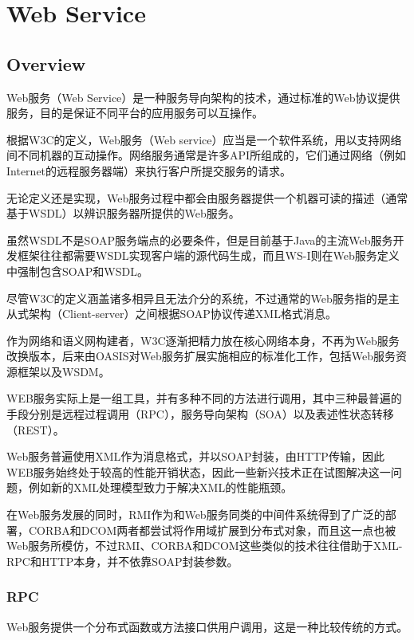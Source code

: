 \part{Web Service}


\chapter{Overview}


Web服务（Web Service）是一种服务导向架构的技术，通过标准的Web协议提供服务，目的是保证不同平台的应用服务可以互操作。

根据W3C的定义，Web服务（Web service）应当是一个软件系统，用以支持网络间不同机器的互动操作。网络服务通常是许多API所组成的，它们通过网络（例如Internet的远程服务器端）来执行客户所提交服务的请求。






无论定义还是实现，Web服务过程中都会由服务器提供一个机器可读的描述（通常基于WSDL）以辨识服务器所提供的Web服务。

虽然WSDL不是SOAP服务端点的必要条件，但是目前基于Java的主流Web服务开发框架往往都需要WSDL实现客户端的源代码生成，而且WS-I则在Web服务定义中强制包含SOAP和WSDL。

尽管W3C的定义涵盖诸多相异且无法介分的系统，不过通常的Web服务指的是主从式架构（Client-server）之间根据SOAP协议传递XML格式消息。

作为网络和语义网构建者，W3C逐渐把精力放在核心网络本身，不再为Web服务改换版本，后来由OASIS对Web服务扩展实施相应的标准化工作，包括Web服务资源框架以及WSDM。

WEB服务实际上是一组工具，并有多种不同的方法进行调用，其中三种最普遍的手段分别是远程过程调用（RPC），服务导向架构（SOA）以及表述性状态转移（REST）。

Web服务普遍使用XML作为消息格式，并以SOAP封装，由HTTP传输，因此WEB服务始终处于较高的性能开销状态，因此一些新兴技术正在试图解决这一问题，例如新的XML处理模型致力于解决XML的性能瓶颈。

在Web服务发展的同时，RMI作为和Web服务同类的中间件系统得到了广泛的部署，CORBA和DCOM两者都尝试将作用域扩展到分布式对象，而且这一点也被Web服务所模仿，不过RMI、CORBA和DCOM这些类似的技术往往借助于XML-RPC和HTTP本身，并不依靠SOAP封装参数。


\section{RPC}


Web服务提供一个分布式函数或方法接口供用户调用，这是一种比较传统的方式。

